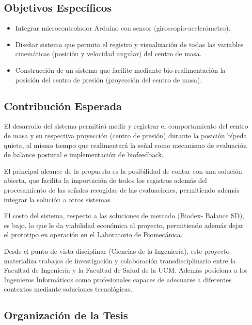 \documentclass[12pt,a4paper]{article}
\begin{document}
\subsection{Objetivos Específicos}
\begin{itemize}
\item Integrar microcontrolador Arduino con sensor (giroscopio-acelerómetro).
\item Diseñar sistema que permita el registro y visualización de todas las variables cinemáticas (posición y velocidad angular) del centro de masa. 
\item Construcción de un sistema que facilite mediante bio-realimentación la posición del centro de presión (proyección del centro de masa).
\end{itemize}	

\subsection{Contribución Esperada}

El desarrollo del sistema permitirá medir y registrar el comportamiento del centro de masa y su respectiva proyección (centro de presión) durante la posición bípeda quieta, al mismo tiempo que realimentará la señal como mecanismo de evaluación de balance postural e implementación de biofeedback.

El principal alcance de la propuesta es la posibilidad de contar con una solución abierta, que facilita la importación de todos los registros además del procesamiento de las señales recogidas de las evaluaciones, permitiendo además integrar la solución a otros sistemas.
 
El costo del sistema, respecto a las soluciones de mercado (Biodex- Balance SD), es bajo, lo que le da viabilidad económica al proyecto, permitiendo además dejar el prototipo en operación en el Laboratorio de Biomecánica. 

Desde el punto de vista disciplinar (Ciencias de la Ingeniería), este proyecto materializa trabajos de investigación y colaboración transdisciplinario entre la Facultad de Ingeniería y la Facultad de Salud de la UCM. Además posiciona a los Ingenieros Informáticos como profesionales capaces de adecuarse a diferentes contextos mediante soluciones tecnológicas.
\subsection{Organizaci\'on de la Tesis}
\end{document}
